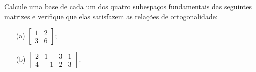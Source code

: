 \begin{question}
  Calcule uma base de cada um dos quatro subespaços fundamentais das seguintes matrizes e verifique que elas satisfazem as relações de ortogonalidade:
  \begin{multicols}{2}
    \begin{itemize}
      \item[(a)] $\begin{bmatrix}
                1 & 2 \\
                3 & 6
              \end{bmatrix}$;
      \item[(b)] $\begin{bmatrix}
                2 & 1  & 3 & 1 \\
                4 & -1 & 2 & 3
              \end{bmatrix}$.
    \end{itemize}
  \end{multicols}
  \vspace{8pt}
\end{question}

